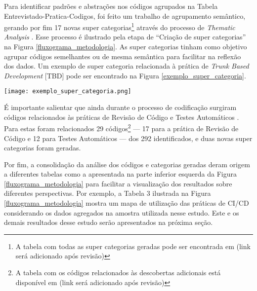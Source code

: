 Para identificar padrões e abstrações nos códigos agrupados na Tabela Entrevistado-Pratica-Codigos, foi feito um trabalho de agrupamento semântico, gerando por fim 17 novas super categorias\footnote{A tabela com todas as super categorias geradas pode ser encontrada em (link será adicionado após revisão)} através do processo de \emph{Thematic Analysis} \cite{groundedTheory}. Esse processo é ilustrado pela etapa de ``Criação de super categorias'' na Figura \ref{fluxograma_metodologia}. As super categorias tinham como objetivo agrupar códigos semelhantes ou de mesma semântica para facilitar na reflexão dos dados. Um exemplo de super categoria relacionada à prática de \emph{Trunk Based Development} [TBD] pode ser encontrado na Figura \ref{exemplo_super_categoria}.


\begin{figure*}[ht]
\begin{center}
\texttt{[image: exemplo\_super\_categoria.png]}
\end{center}
\caption[Exemplo de super categoria]{
    Exemplo de super categoria gerada durante o processo de \emph{Thematic Analysis}.
}\label{exemplo_super_categoria}
\end{figure*}


É importante salientar que ainda durante o processo de codificação surgiram códigos relacionados às práticas de Revisão de Código \cite{codeReview} e Testes Automáticos \cite{devopsBook}. Para estas foram relacionados 29 códigos\footnote{A tabela com os códigos relacionados às descobertas adicionais está disponível em (link será adicionado após revisão)} --- 17 para a prática de Revisão de Código e 12 para Testes Automáticos --- dos 292 identificados, e duas novas super categorias foram geradas.

Por fim, a consolidação da análise dos códigos e categorias geradas deram origem a diferentes tabelas como a apresentada na parte inferior esquerda da Figura \ref{fluxograma_metodologia} para facilitar a visualização dos resultados sobre diferentes perspectivas. Por exemplo, a Tabela 3 ilustrada na Figura \ref{fluxograma_metodologia} mostra um mapa de utilização das práticas de CI/CD considerando os dados agregados na amostra utilizada nesse estudo. Este e os demais resultados desse estudo serão apresentados na próxima seção.

